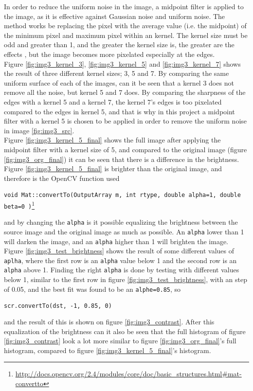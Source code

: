 In order to reduce the uniform noise in the image, a midpoint filter is applied to the image, as it is effective against Gaussian noise and uniform noise\cite{uni}. The method works be replacing the pixel with the average value (i.e. the midpoint) of the minimum pixel and maximum pixel within an kernel.  The kernel size must be odd and greater than 1, and the greater the kernel size is, the greater are the effects , but the image becomes more pixelated especially at the edges.  \\[0.2cm]
Figure \ref{fig:img3_kernel_3}, \ref{fig:img3_kernel_5} and \ref{fig:img3_kernel_7} shows the result of three different kernel sizes; 3, 5 and 7. By comparing the same uniform surface of each of the images, can it be seen that a kernel 3 does not remove all the noise, but kernel 5 and 7 does. By comparing the sharpness of the edges with a kernel 5 and a kernel 7, the kernel 7's edges is too pixelated compared to the edges in kernel 5, and that is why in this project a midpoint filter with a kernel 5 is chosen to be applied in order to remove the uniform noise in image \ref{fig:img3_src}.\\[0.2cm]
Figure \ref{fig:img3_kernel_5_final} shows the full image after applying the midpoint filter with a kernel size of 5, and compared to the original image (figure \ref{fig:img3_org_final}) it can be seen that there is a difference in the brightness. Figure \ref{fig:img3_kernel_5_final} is brighter than the original image, and therefore is the OpenCV function used
\begin{center}
\lstinline|void Mat::convertTo(OutputArray m, int rtype, double alpha=1, double beta=0 )|\footnote{\url{http://docs.opencv.org/2.4/modules/core/doc/basic_structures.html\#mat-convertto}}
\end{center}
and by changing the \lstinline|alpha| is it possible equalizing the brightness between the source image and the original image as much as possible. An \lstinline|alpha| lower than 1 will darken the image, and an \lstinline|alpha| higher than 1 will brighten the image. Figure \ref{fig:img3_test_brightness} shows the result of some different values of \lstinline|aplha|, where the first row is an \lstinline|alpha| value below 1 and the second row is an \lstinline|alpha| above 1. Finding the right \lstinline|alpha| is done by testing with different values below 1, similar to the first row in figure \ref{fig:img3_test_brightness}, with an step of 0.05, and the best fit was found to be an \lstinline|alphe=0.85|, so 
\begin{center}
\lstinline|scr.convertTo(dst, -1, 0.85, 0)|
\end{center}
and the result of this is shown on figure \ref{fig:img3_contrast}. After this equalization  of the brightness can it also be seen that the full histogram of figure \ref{fig:img3_contrast} look a lot more similar to figure \ref{fig:img3_org_final}'s full histogram, compared to figure \ref{fig:img3_kernel_5_final}'s histogram.

